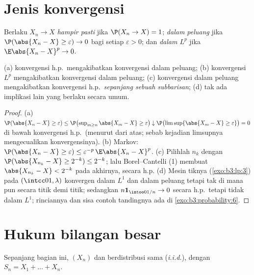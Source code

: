 \section{Jenis konvergensi}

\begin{definition}\label{def:b3:probability:modes}
Berlaku $X_n \to X$ \emph{hampir pasti} jika $\P(X_n \to X) = 1$;
\emph{dalam peluang} jika $\P(\abs{X_n - X} \geq \varepsilon)
\to 0$ bagi setiap $\varepsilon > 0$; dan \emph{dalam $L^p$} jika
$\E\abs{X_n - X}^p \to 0$.
\end{definition}

\begin{proposition}\label{prop:b3:probability:modes}
(a) konvergensi h.p.\ mengakibatkan konvergensi dalam peluang;
(b) konvergensi $L^p$ mengakibatkan konvergensi dalam peluang;
(c) konvergensi dalam peluang mengakibatkan konvergensi h.p.\
\emph{sepanjang sebuah subbarisan};
(d) tak ada implikasi lain yang berlaku secara umum.
\end{proposition}

\begin{proof}
(a) $\P(\abs{X_n - X} \geq \varepsilon) \leq
\P\bigl(\sup_{m\geq n}\abs{X_m - X} \geq \varepsilon\bigr)
\downarrow \P\bigl(\limsup\{\abs{X_m - X} \geq
\varepsilon\}\bigr) = 0$ di bawah konvergensi h.p.\ (menurut 
dari atas; sebab kejadian limsupnya mengecualikan konvergensinya). (b)
Markov: $\P(\abs{X_n - X} \geq \varepsilon) \leq
\varepsilon^{-p}\,\E\abs{X_n - X}^p$. (c) Pilihlah $n_k$ dengan
$\P(\abs{X_{n_k} - X} \geq 2^{-k}) \leq 2^{-k}$;
lalu Borel--Cantelli (1) membuat $\abs{X_{n_k} - X} < 2^{-k}$
pada akhirnya, secara h.p. (d) Mesin tiknya (\cref{exo:b3:lp:3}) pada
$(\intcc01, \lambda)$ konvergen dalam $L^1$ dan dalam peluang
tetapi tak di mana pun secara titik demi titik; sedangkan $n\mathbf 1_{\intoo0{1/n}} \to 0$
secara h.p.\ tetapi tidak dalam $L^1$; rinciannya dan sisa
contoh tandingnya ada di \cref{exo:b3:probability:6}.
\end{proof}

\section{Hukum bilangan besar}

Sepanjang bagian ini, $(X_n)$  dan berdistribusi sama
(\emph{i.i.d.}), dengan $S_n = X_1 + \dots + X_n$.

